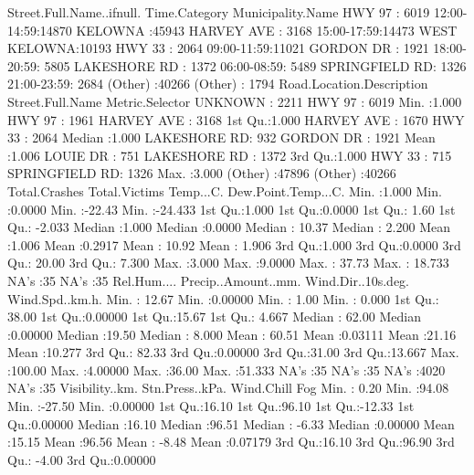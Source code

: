 \documentclass[11pt, a4paper]{article}
\begin{document}
\begin{Schunk}
\begin{Soutput}
  Street.Full.Name..ifnull.     Time.Category      Municipality.Name
 HWY 97        : 6019       12:00-14:59:14870   KELOWNA     :45943  
 HARVEY AVE    : 3168       15:00-17:59:14473   WEST KELOWNA:10193  
 HWY 33        : 2064       09:00-11:59:11021                       
 GORDON DR     : 1921       18:00-20:59: 5805                       
 LAKESHORE RD  : 1372       06:00-08:59: 5489                       
 SPRINGFIELD RD: 1326       21:00-23:59: 2684                       
 (Other)       :40266       (Other)    : 1794                       
 Road.Location.Description       Street.Full.Name Metric.Selector
 UNKNOWN     : 2211        HWY 97        : 6019   Min.   :1.000  
 HWY 97      : 1961        HARVEY AVE    : 3168   1st Qu.:1.000  
 HARVEY AVE  : 1670        HWY 33        : 2064   Median :1.000  
 LAKESHORE RD:  932        GORDON DR     : 1921   Mean   :1.006  
 LOUIE DR    :  751        LAKESHORE RD  : 1372   3rd Qu.:1.000  
 HWY 33      :  715        SPRINGFIELD RD: 1326   Max.   :3.000  
 (Other)     :47896        (Other)       :40266                  
 Total.Crashes   Total.Victims      Temp...C.      Dew.Point.Temp...C.
 Min.   :1.000   Min.   :0.0000   Min.   :-22.43   Min.   :-24.433    
 1st Qu.:1.000   1st Qu.:0.0000   1st Qu.:  1.60   1st Qu.: -2.033    
 Median :1.000   Median :0.0000   Median : 10.37   Median :  2.200    
 Mean   :1.006   Mean   :0.2917   Mean   : 10.92   Mean   :  1.906    
 3rd Qu.:1.000   3rd Qu.:0.0000   3rd Qu.: 20.00   3rd Qu.:  7.300    
 Max.   :3.000   Max.   :9.0000   Max.   : 37.73   Max.   : 18.733    
                                  NA's   :35       NA's   :35         
  Rel.Hum....     Precip..Amount..mm. Wind.Dir..10s.deg. Wind.Spd..km.h. 
 Min.   : 12.67   Min.   :0.00000     Min.   : 1.00      Min.   : 0.000  
 1st Qu.: 38.00   1st Qu.:0.00000     1st Qu.:15.67      1st Qu.: 4.667  
 Median : 62.00   Median :0.00000     Median :19.50      Median : 8.000  
 Mean   : 60.51   Mean   :0.03111     Mean   :21.16      Mean   :10.277  
 3rd Qu.: 82.33   3rd Qu.:0.00000     3rd Qu.:31.00      3rd Qu.:13.667  
 Max.   :100.00   Max.   :4.00000     Max.   :36.00      Max.   :51.333  
 NA's   :35       NA's   :35          NA's   :4020       NA's   :35      
 Visibility..km. Stn.Press..kPa.   Wind.Chill          Fog         
 Min.   : 0.20   Min.   :94.08   Min.   :-27.50   Min.   :0.00000  
 1st Qu.:16.10   1st Qu.:96.10   1st Qu.:-12.33   1st Qu.:0.00000  
 Median :16.10   Median :96.51   Median : -6.33   Median :0.00000  
 Mean   :15.15   Mean   :96.56   Mean   : -8.48   Mean   :0.07179  
 3rd Qu.:16.10   3rd Qu.:96.90   3rd Qu.: -4.00   3rd Qu.:0.00000  

\end{Soutput}
\end{Schunk}
\end{document}
